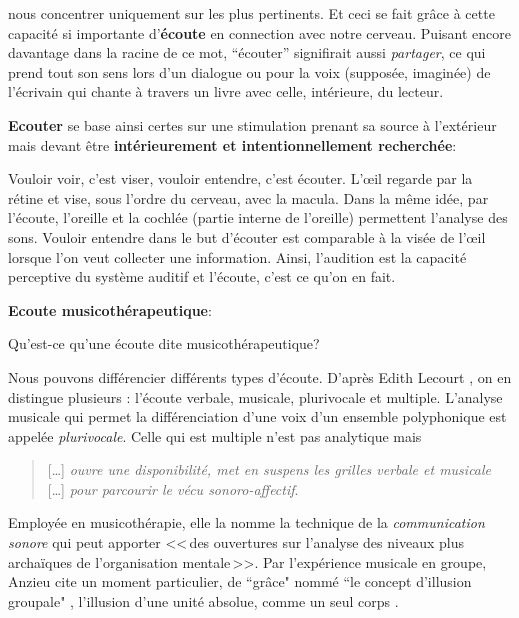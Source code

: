 nous concentrer uniquement sur les plus  pertinents. Et ceci se fait grâce à cette capacité si importante
d'\textbf{écoute} en connection avec notre cerveau.
Puisant encore davantage dans  la racine de ce mot, ``écouter'' signifirait
aussi \emph{partager}, ce qui prend tout son sens lors d'un dialogue ou
pour la voix (supposée, imaginée) de  l'écrivain qui
 chante à travers un livre avec celle, intérieure, du lecteur.


  \textbf{Ecouter} se base ainsi certes sur une stimulation prenant sa source à
l'extérieur mais devant être \textbf{ intérieurement et intentionnellement
	recherchée}:

  Vouloir voir, c'est viser, vouloir entendre, c'est
      écouter.
  L'\oe il regarde par la rétine et  vise, sous l'ordre du
  cerveau, avec la macula. Dans la même idée, par l'écoute,
  l'oreille et la cochlée (partie interne de l'oreille) permettent
  l'analyse des sons. Vouloir entendre dans le but d'écouter est comparable  à
  la visée de l'\oe il lorsque l'on veut collecter une
  information.
   Ainsi, l'audition est la capacité perceptive du système auditif et l'écoute, c'est ce qu'on en fait.


      \textbf{Ecoute musicothérapeutique}:


Qu'est-ce qu'une écoute dite musicothérapeutique?

Nous pouvons  différencier différents types d'écoute. D'après Edith Lecourt \autocite [182] 
{lecourt:decouvrir},
on en distingue plusieurs : l'écoute verbale, musicale, plurivocale et multiple.
 L'analyse musicale qui permet la différenciation d'une voix d'un ensemble polyphonique est appelée \emph{plurivocale}. Celle qui est multiple n'est pas analytique  mais
 \begin{quote}
 	 [\ldots] \textit{ouvre une disponibilité, met en suspens les grilles verbale et musicale} [\ldots] \emph{pour parcourir le vécu sonoro-affectif}\autocite[183]{lecourt:decouvrir}.
 \end{quote}
 Employée en musicothérapie, elle la nomme la technique de la  \emph{communication sonore} qui peut apporter
 <<\,des ouvertures sur l'analyse des niveaux plus archaïques de l'organisation mentale\,>>\autocite[154]{lecourt:decouvrir}.
 Par l'expérience musicale en groupe, Anzieu cite un moment
 particulier, de ``grâce"  nommé ``le concept d'illusion groupale" \autocite[113]{AnzieuMoiPeau},
 l'illusion d'une unité absolue, comme un seul corps .


